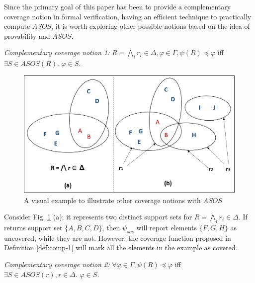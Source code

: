 Since the primary goal of
 this paper has been to provide a complementary coverage notion in
  formal verification, having an efficient technique to practically compute $ASOS$, it is worth exploring other possible notions based on the idea of provability and $ASOS$. 
  
\begin{definition} {\emph{Complementary coverage notion 1:}}
  \label{def:comp-1}
   $ R = \bigwedge_{i} {r_i \in \Delta}, \varphi \in \Gamma,  \psi (R) \preccurlyeq \varphi$ iff $ \exists S 
   \in ASOS(R)$. $\varphi \in S$.
\end{definition}

\begin{figure}
\begin{center}
\includegraphics[width=\columnwidth]{figs/disc.png}
\vspace{-0.1in}
\caption{A visual example to illustrate other coverage notions with $ASOS$}\label{fig:disc}
\end{center}
\end{figure}

Consider Fig. \ref{fig:disc} (a); it represents two distinct support sets for $ R = \bigwedge_{i} {r_i \in \Delta}$. If \ucalg returns support set $\{ A, B, C, D\}$, then $\psi_{sos}$ will
report elements $\{ F, G, H\}$ as uncovered, while they are not. However, 
the coverage function proposed in Definition \ref{def:comp-1} will mark all the elements in the example as covered.

\begin{definition} {\emph{Complementary coverage notion 2:}}
  \label{def:comp-2}
   $\forall \varphi \in \Gamma,  \psi (R) \preccurlyeq \varphi$ iff $ \exists S
   \in ASOS(r), r \in \Delta$. $\varphi \in S$.
\end{definition}

